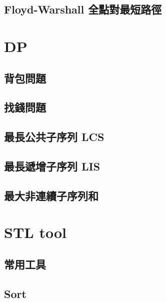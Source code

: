 \subsection{Floyd-Warshall 全點對最短路徑}




\section{DP}



\subsection{背包問題}


\subsection{找錢問題}


\subsection{最長公共子序列 LCS}


\subsection{最長遞增子序列 LIS}


\subsection{最大非連續子序列和}






\section{STL tool}

\subsection{常用工具}


\subsection{Sort}


